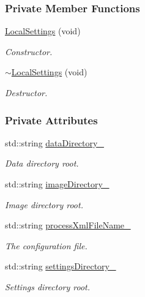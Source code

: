 \subsubsection*{Private Member Functions}
\begin{DoxyCompactItemize}
\item 
\hyperlink{group___core_a70ef22059fb84a1a64120f3122db615e}{Local\-Settings} (void)
\begin{DoxyCompactList}\small\item\em Constructor. \end{DoxyCompactList}\item 
\hyperlink{group___core_a043074a18b94b6c572e31feb2d283926}{$\sim$\-Local\-Settings} (void)
\begin{DoxyCompactList}\small\item\em Destructor. \end{DoxyCompactList}\end{DoxyCompactItemize}
\subsubsection*{Private Attributes}
\begin{DoxyCompactItemize}
\item 
std\-::string \hyperlink{group___core_a7cddf57927891a603552ca37a8839f22}{data\-Directory\-\_\-}
\begin{DoxyCompactList}\small\item\em Data directory root. \end{DoxyCompactList}\item 
std\-::string \hyperlink{group___core_aef55a56deb4853e3c7c2d17f87a65be7}{image\-Directory\-\_\-}
\begin{DoxyCompactList}\small\item\em Image directory root. \end{DoxyCompactList}\item 
std\-::string \hyperlink{group___core_a19de001426c0ff8e8d4284202b929b08}{process\-Xml\-File\-Name\-\_\-}
\begin{DoxyCompactList}\small\item\em The configuration file. \end{DoxyCompactList}\item 
std\-::string \hyperlink{group___core_af27f60deac73d6236070b4b78ed2fcbf}{settings\-Directory\-\_\-}
\begin{DoxyCompactList}\small\item\em Settings directory root. \end{DoxyCompactList}\end{DoxyCompactItemize}


